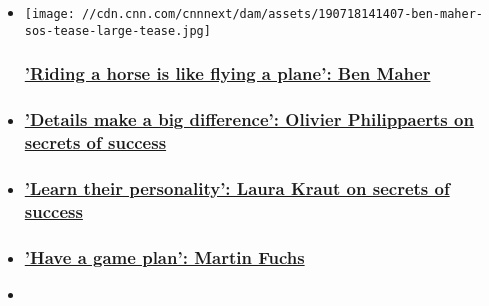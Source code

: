 \begin{itemize}
\item
  \href{/2019/07/19/sport/ben-maher-secrets-of-success-equestrian-spt-intl/index.html}{}

  \texttt{[image: //cdn.cnn.com/cnnnext/dam/assets/190718141407-ben-maher-sos-tease-large-tease.jpg]}

  \hypertarget{riding-a-horse-is-like-flying-a-plane-ben-maher}{%
  \subsubsection{\texorpdfstring{\href{/2019/07/19/sport/ben-maher-secrets-of-success-equestrian-spt-intl/index.html}{'Riding
  a horse is like flying a plane': Ben
  Maher}}{'Riding a horse is like flying a plane': Ben Maher}}\label{riding-a-horse-is-like-flying-a-plane-ben-maher}}
\item
  \hypertarget{details-make-a-big-difference-olivier-philippaerts-on-secrets-of-success}{%
  \subsubsection{\texorpdfstring{\href{/2019/09/06/sport/olivier-philippaerts-secrets-of-success-equestrian-spt-intl/index.html}{'Details
  make a big difference': Olivier Philippaerts on secrets of
  success}}{'Details make a big difference': Olivier Philippaerts on secrets of success}}\label{details-make-a-big-difference-olivier-philippaerts-on-secrets-of-success}}
\item
  \hypertarget{learn-their-personality-laura-kraut-on-secrets-of-success}{%
  \subsubsection{\texorpdfstring{\href{/2019/08/21/sport/laura-kraut-secrets-of-success-equestrian-spt-intl/index.html}{'Learn
  their personality': Laura Kraut on secrets of
  success}}{'Learn their personality': Laura Kraut on secrets of success}}\label{learn-their-personality-laura-kraut-on-secrets-of-success}}
\item
  \hypertarget{have-a-game-plan-martin-fuchs}{%
  \subsubsection{\texorpdfstring{\href{/2019/08/16/sport/martin-fuchs-gcl-equestrian-secrets-of-success-spt-intl/index.html}{'Have
  a game plan': Martin
  Fuchs}}{'Have a game plan': Martin Fuchs}}\label{have-a-game-plan-martin-fuchs}}
\item
  \hypertarget{always-want-to-learn-daniel-deusser-}{%
}
\end{itemize}
